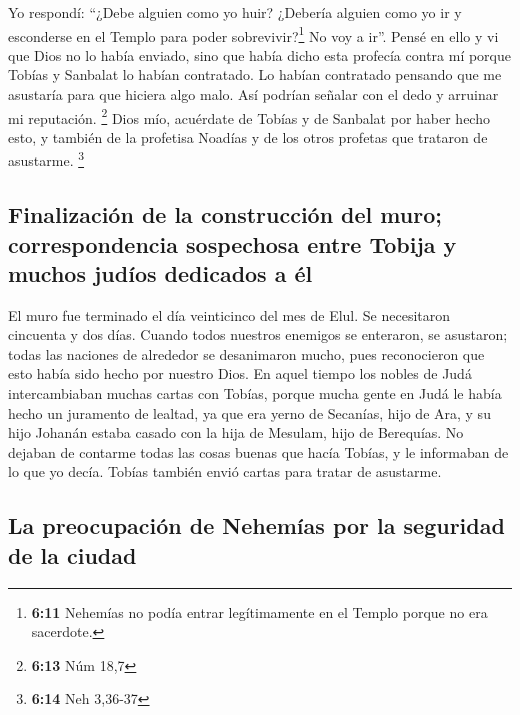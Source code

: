  Yo respondí: ``¿Debe alguien como yo huir? ¿Debería
alguien como yo ir y esconderse en el Templo para poder
sobrevivir?\footnote{\textbf{6:11} Nehemías no podía entrar
  legítimamente en el Templo porque no era sacerdote.} No voy a ir''.
 Pensé en ello y vi que Dios no lo había enviado, sino
que había dicho esta profecía contra mí porque Tobías y Sanbalat lo
habían contratado.  Lo habían contratado pensando que me
asustaría para que hiciera algo malo. Así podrían señalar con el dedo y
arruinar mi reputación. \footnote{\textbf{6:13} Núm 18,7}
 Dios mío, acuérdate de Tobías y de Sanbalat por haber
hecho esto, y también de la profetisa Noadías y de los otros profetas
que trataron de asustarme. \footnote{\textbf{6:14} Neh 3,36-37}

\hypertarget{finalizaciuxf3n-de-la-construcciuxf3n-del-muro-correspondencia-sospechosa-entre-tobija-y-muchos-juduxedos-dedicados-a-uxe9l}{%
\subsection{Finalización de la construcción del muro; correspondencia
sospechosa entre Tobija y muchos judíos dedicados a
él}\label{finalizaciuxf3n-de-la-construcciuxf3n-del-muro-correspondencia-sospechosa-entre-tobija-y-muchos-juduxedos-dedicados-a-uxe9l}}

 El muro fue terminado el día veinticinco del mes de
Elul. Se necesitaron cincuenta y dos días.  Cuando todos
nuestros enemigos se enteraron, se asustaron; todas las naciones de
alrededor se desanimaron mucho, pues reconocieron que esto había sido
hecho por nuestro Dios.  En aquel tiempo los nobles de
Judá intercambiaban muchas cartas con Tobías,  porque
mucha gente en Judá le había hecho un juramento de lealtad, ya que era
yerno de Secanías, hijo de Ara, y su hijo Johanán estaba casado con la
hija de Mesulam, hijo de Berequías.  No dejaban de
contarme todas las cosas buenas que hacía Tobías, y le informaban de lo
que yo decía. Tobías también envió cartas para tratar de asustarme.

\hypertarget{la-preocupaciuxf3n-de-nehemuxedas-por-la-seguridad-de-la-ciudad}{%
\subsection{La preocupación de Nehemías por la seguridad de la
ciudad}\label{la-preocupaciuxf3n-de-nehemuxedas-por-la-seguridad-de-la-ciudad}}

